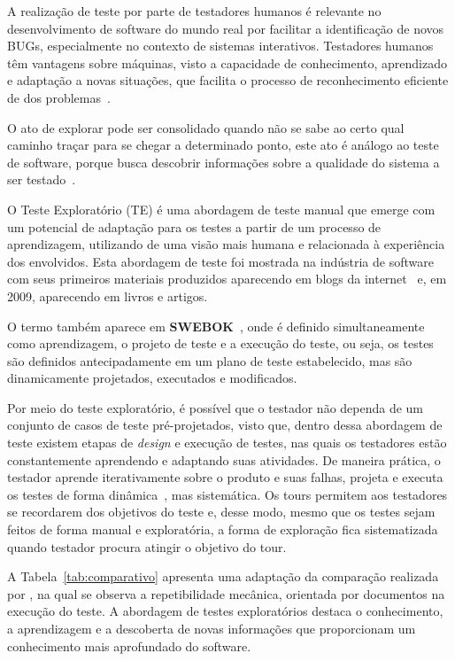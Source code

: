 A realização de teste por parte de testadores humanos é relevante no desenvolvimento de software do mundo real por facilitar a identificação de novos BUGs, especialmente no contexto de sistemas interativos. Testadores humanos têm vantagens sobre máquinas, visto a capacidade de conhecimento, aprendizado e adaptação a novas situações, que facilita o processo de reconhecimento eficiente de dos problemas~\cite{itkonen2015test}. 

O ato de explorar pode ser consolidado quando não se sabe ao certo qual caminho traçar para se chegar a determinado ponto, este ato é análogo ao teste de software, porque busca descobrir informações sobre a qualidade do sistema a ser testado~\cite{itkonen2015test}.

O Teste Exploratório (TE) é uma abordagem de teste manual que emerge com um potencial de adaptação para os testes a partir de um processo de aprendizagem, utilizando de uma visão mais humana e relacionada à experiência dos envolvidos. Esta abordagem de teste foi mostrada na indústria de software com seus primeiros materiais produzidos aparecendo em blogs da internet~\cite{kaner2000testing} e, em 2009, aparecendo em livros e artigos. 

O termo também aparece em \textbf{SWEBOK}~\cite{bourque2014guide}, onde é definido simultaneamente como aprendizagem, o projeto de teste 
e a execução do teste, ou seja, os testes são definidos antecipadamente em um plano de teste estabelecido, mas 
são dinamicamente projetados, executados e modificados.

Por meio do teste exploratório, é possível que o testador não dependa de um conjunto de casos de teste pré-projetados, visto que, dentro dessa abordagem de teste existem etapas de \textit{design} e execução de testes, nas quais os testadores estão constantemente aprendendo e 
adaptando suas atividades. De maneira prática, o testador aprende iterativamente sobre o produto e suas falhas, projeta e executa os testes de forma dinâmica~\cite{whittaker2009exploratory}, mas sistemática. Os tours permitem aos testadores se recordarem dos objetivos do teste e, desse modo, mesmo que os testes sejam feitos de forma manual e exploratória, a forma de exploração fica sistematizada quando testador procura atingir o objetivo do tour.

A Tabela~\ref{tab:comparativo} apresenta uma adaptação da comparação realizada por \cite{itkonen2015test}, na qual se observa a repetibilidade mecânica, orientada por documentos na execução do teste. A abordagem de testes exploratórios destaca o conhecimento, a aprendizagem e a descoberta de novas informações que proporcionam um conhecimento mais aprofundado do software. 

